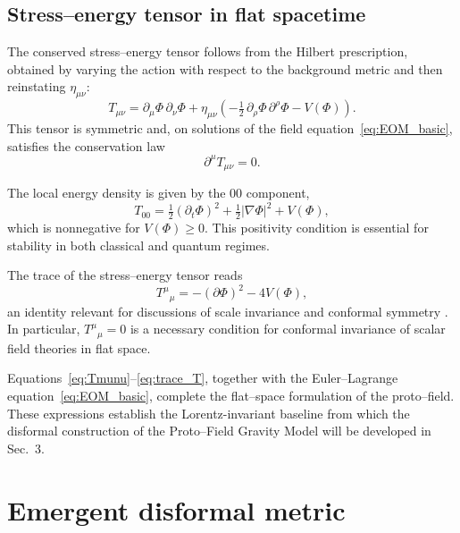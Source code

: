 \documentclass{article}
\begin{document}

\subsection{Stress–energy tensor in flat spacetime}

The conserved stress–energy tensor follows from the Hilbert prescription, obtained by varying the action with respect to the background metric and then reinstating $\eta_{\mu\nu}$:
\begin{equation}
T_{\mu\nu} 
= \partial_\mu \Phi \,\partial_\nu \Phi
+ \eta_{\mu\nu}\!\left(-\tfrac{1}{2}\,\partial_\rho \Phi \,\partial^\rho \Phi 
- V(\Phi)\right).
\label{eq:Tmunu}
\end{equation}
This tensor is symmetric and, on solutions of the field equation~\eqref{eq:EOM_basic}, satisfies the conservation law
\begin{equation}
\partial^\mu T_{\mu\nu} = 0 .
\label{eq:Tmunu_conservation}
\end{equation}

The local energy density is given by the $00$ component,
\begin{equation}
T_{00} = \tfrac{1}{2}(\partial_t \Phi)^2 
+ \tfrac{1}{2}|\nabla \Phi|^2 
+ V(\Phi),
\label{eq:T00}
\end{equation}
which is nonnegative for $V(\Phi)\ge0$. This positivity condition is essential for stability in both classical and quantum regimes.

The trace of the stress–energy tensor reads
\begin{equation}
T^\mu{}_\mu = -(\partial \Phi)^2 - 4V(\Phi),
\label{eq:trace_T}
\end{equation}
an identity relevant for discussions of scale invariance and conformal symmetry \cite{Coleman1971,Callan1970}. In particular, $T^\mu{}_\mu=0$ is a necessary condition for conformal invariance of scalar field theories in flat space.

Equations~\eqref{eq:Tmunu}–\eqref{eq:trace_T}, together with the Euler–Lagrange equation~\eqref{eq:EOM_basic}, complete the flat–space formulation of the proto–field. These expressions establish the Lorentz-invariant baseline from which the disformal construction of the Proto–Field Gravity Model will be developed in Sec.~3.

\section{Emergent disformal metric}
\label{sec:disformal}
\end{document}
